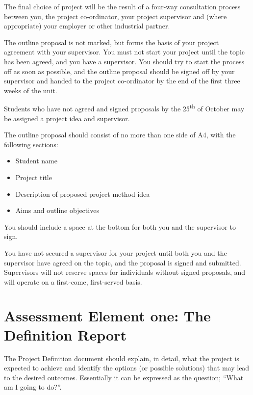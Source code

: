 The final choice of project will be the result of a four-way consultation process between you, the project co-ordinator, your project supervisor and (where  appropriate) your employer or other industrial partner.

The outline proposal is not marked, but forms the basis of your project agreement with your supervisor. You must not start your project until the topic has been agreed, and you have a supervisor. You should try to start the process off as soon as possible, and the outline proposal should be signed off by your supervisor and handed to the project co-ordinator by the end of the first three weeks of the unit.

\begin{tcolorbox}
    Students who have not agreed and signed proposals by the 25\textsuperscript{th} of October may be assigned a project idea and supervisor. 
\end{tcolorbox}

The outline proposal should consist of no more than one side of A4, with the following sections:

\begin{itemize}
    \item Student name
    \item Project title
    \item Description of proposed project method idea
    \item Aims and outline objectives
\end{itemize}

You should include a space at the bottom for both you and the supervisor to sign. 

\begin{tcolorbox}
    You have not secured a supervisor for your project until both you and the supervisor have agreed on the topic, and the proposal is signed and submitted. Supervisors will not reserve spaces for individuals without signed proposals, and will operate on a first-come, first-served basis.
\end{tcolorbox}


\section{Assessment Element one: The Definition Report}

The Project Definition document should explain, in detail, what the project is expected to achieve and identify the options (or possible solutions) that may lead to the desired outcomes. Essentially it can be expressed as the question; “What am I going to do?”.


